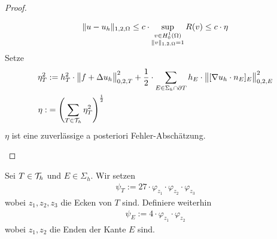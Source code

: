 \begin{proof}
\begin{enumerate}[label=\roman*)]
\begin{align*}
			\Vert u-u_h\Vert_{1,2,\Omega}
			\leq
			c\cdot\sup\limits_{\begin{subarray}{c}v\in H_0^1(\Omega)\\\Vert v\Vert_{1,2,\Omega}=1\end{subarray}}R(v) \leq c \cdot \eta
		\end{align*}
		Setze
		\begin{align*}
			\eta_T^2&:=h_T^2\cdot\big\Vert f+\Delta u_h\big\Vert^2_{0,2,T}+\frac{1}{2}\cdot\sum\limits_{E\in\Sigma_k\cap\partial T}h_E\cdot\big\Vert[\nabla u_h\cdot n_E]_E\big\Vert^2_{0,2,E}\\
			\eta:&=\left(\sum\limits_{T\in\mathcal{T}_h}\eta^2_T\right)^{\frac{1}{	2}}
		\end{align*}
		$\eta$ ist eine zuverlässige a posteriori Fehler-Abschätzung.
	\end{enumerate}
\end{proof}

\begin{definition}\enter %
	Sei $T\in\mathcal{T}_h$ und $E\in\Sigma_h$. Wir setzen
	\begin{align*}
		\psi_T:=27\cdot\varphi_{z_1}\cdot\varphi_{z_2}\cdot\varphi_{z_3}
	\end{align*}
	wobei $z_1,z_2,z_3$ die Ecken von $T$ sind. Definiere weiterhin
	\begin{align*}
		\psi_E:=4\cdot\varphi_{z_1}\cdot\varphi_{z_2}
	\end{align*}
	wobei $z_1,z_2$ die Enden der Kante $E$ sind.
\end{definition}

